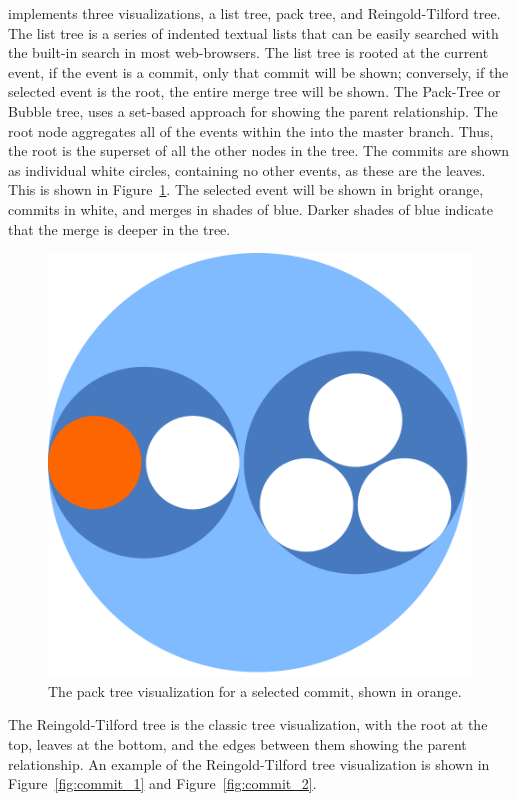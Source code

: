 \tool implements three visualizations, a list tree, pack tree, and
Reingold-Tilford tree. The list tree is a series of indented textual
lists that can be easily searched with the built-in search in most
web-browsers. The list tree is rooted at the current event, if the event
is a commit, only that commit will be shown; conversely, if the selected
event is the root, the entire merge tree will be shown. The Pack-Tree or
Bubble tree, uses a set-based approach for showing the parent
relationship. The root node aggregates all of the events within the \mt
into the master branch. Thus, the root is the superset of all the other
nodes in the tree. The commits are shown as individual white circles,
containing no other events, as these are the leaves. This is shown in
Figure~\ref{fig:linvis_pack}. The selected event will be shown in bright
orange, commits in white, and merges in shades of blue. Darker shades of
blue indicate that the merge is deeper in the tree.

\begin{figure}[htpb]
  \centering
  \includegraphics[width=0.8\linewidth]{figures/linvis/linvis_bubble.pdf}
  \caption{The pack tree visualization for a selected commit, shown in
    orange.}
  \label{fig:linvis_pack}
\end{figure}

The Reingold-Tilford tree is the classic tree visualization, with the
root at the top, leaves at the bottom, and the edges between them
showing the parent relationship. An example of the Reingold-Tilford tree
visualization is shown in Figure~\ref{fig:commit_1} and
Figure~\ref{fig:commit_2}.

